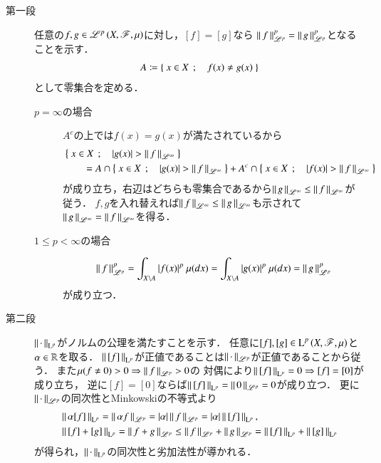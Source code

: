 \begin{prf}\mbox{}
	\begin{description}
		\item[第一段]
			任意の$f,g \in \mathscr{L}^{p} \left(X,\mathscr{F},\mu\right)$に対し，$[f] = [g]$なら
			$\left\|\, f\, \right\|_{\mathscr{L}^p}^p = \left\|\, g\, \right\|_{\mathscr{L}^p}^p$となることを示す．
			\begin{align}
				A \coloneqq \left\{\ x \in X\ \, ; \quad f(x) \neq g(x)\ \right\}
			\end{align}
			として零集合を定める．
			\begin{description}
				\item[$p = \infty$の場合]
					$A^c$の上では$f(x)=g(x)$が満たされているから
					\begin{align}
						&\left\{\ x \in X\ \, ; \quad |g(x)| > \left\|\, f\, \right\|_{\mathscr{L}^\infty}\ \right\} \\
						&\qquad = A \cap \left\{\ x \in X\ \, ; \quad |g(x)| > \left\|\, f\, \right\|_{\mathscr{L}^\infty}\ \right\} + A^c \cap \left\{\ x \in X\ \, ; \quad |f(x)| > \left\|\, f\, \right\|_{\mathscr{L}^\infty}\ \right\}
					\end{align}
					が成り立ち，右辺はどちらも零集合であるから$\left\|\, g\, \right\|_{\mathscr{L}^\infty} \leq \left\|\, f\, \right\|_{\mathscr{L}^\infty}$が従う．
					$f,g$を入れ替えれば$\left\|\, f\, \right\|_{\mathscr{L}^\infty} \leq \left\|\, g\, \right\|_{\mathscr{L}^\infty}$も示されて
					$\left\|\, g\, \right\|_{\mathscr{L}^\infty} = \left\|\, f\, \right\|_{\mathscr{L}^\infty}$を得る．
					
				\item[$1 \leq p < \infty$の場合]
					\begin{align}
						\left\|\, f\, \right\|_{\mathscr{L}^p}^p = \int_{X \backslash A} |f(x)|^p\ \mu(dx) 
						= \int_{X \backslash A} |g(x)|^p\ \mu(dx) = \left\|\, g\, \right\|_{\mathscr{L}^p}^p
					\end{align}
					が成り立つ．
			\end{description}
		
		\item[第二段]
			$\left\|\, \cdot\, \right\|_{\mathrm{L}^p}$がノルムの公理を満たすことを示す．
			任意に$[f],[g] \in \operatorname{L}^{p} \left(X,\mathscr{F},\mu\right)$と$\alpha \in \mathbb{R}$を取る．
			$\left\|\, [f]\, \right\|_{\mathrm{L}^p}$が正値であることは$\left\|\, \cdot\, \right\|_{\mathscr{L}^p}$が正値であることから従う．
			また$\mu(f \neq 0) > 0 \Rightarrow \left\|\, f\, \right\|_{\mathscr{L}^p} > 0$の
			対偶により$\left\|\, [f]\, \right\|_{\mathrm{L}^p} = 0 \Rightarrow [f] = [0]$が成り立ち，
			逆に$[f] = [0]$ならば$\left\|\, [f]\, \right\|_{\mathrm{L}^p} = \left\|\, 0\, \right\|_{\mathscr{L}^p} = 0$が成り立つ．
			更に$\left\|\, \cdot\, \right\|_{\mathscr{L}^p}$の同次性とMinkowskiの不等式より
			\begin{align}
				&\left\|\, \alpha[f]\, \right\|_{\mathrm{L}^p} = \left\|\, \alpha f\, \right\|_{\mathscr{L}^p} = |\alpha|\left\|\, f\, \right\|_{\mathscr{L}^p} = |\alpha|\left\|\, [f]\, \right\|_{\mathrm{L}^p}, \\
				&\left\|\, [f] + [g]\, \right\|_{\mathrm{L}^p} = \left\|\, f + g\, \right\|_{\mathscr{L}^p} \leq \left\|\, f\, \right\|_{\mathscr{L}^p} + \left\|\, g\, \right\|_{\mathscr{L}^p} = \left\|\, [f]\, \right\|_{\mathrm{L}^p} + \left\|\, [g]\, \right\|_{\mathrm{L}^p}
			\end{align}
			が得られ，$\left\|\, \cdot\, \right\|_{\mathrm{L}^p}$の同次性と劣加法性が導かれる．
			\QED
	\end{description}
\end{prf}

